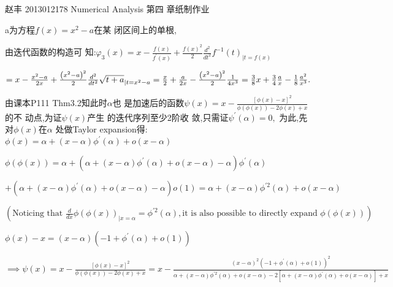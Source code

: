 \documentclass{article}
\begin{document}
\bigskip 赵丰 2013012178 Numerical Analysis 第四%
章纸制作业


\bigskip a为方程$f\left( x\right) =x^{2}-a$在某%
闭区间上的单根,

由迭代函数的构造可%
知:$\varphi _{3}\left( x\right) =x-\frac{f\left( x\right) }{f^{\prime
}\left( x\right) }+\frac{f\left( x\right) ^{2}}{2}\frac{d^{2}}{dt^{2}}%
f^{-1}\left( t\right) _{|t=f\left( x\right) }$

$=x-\frac{x^{2}-a}{2x}+\frac{\left( x^{2}-a\right) ^{2}}{2}\frac{d^{2}}{%
dt^{2}}\sqrt{t+a}_{|t=x^{2}-a}=\frac{x}{2}+\frac{a}{2x}-\frac{\left(
x^{2}-a\right) ^{2}}{2}\frac{1}{4x^{3}}=\allowbreak \allowbreak \frac{3}{8}x+%
\frac{3}{4}\frac{a}{x}-\frac{1}{8}\frac{a^{2}}{x^{3}}.$


由课本P111 Thm3.2知此时$\alpha $也%
是加速后的函数$\psi \left(
x\right) =x-\frac{\left[ \phi \left( x\right) -x\right] ^{2}}{\phi \left(
\phi \left( x\right) \right) -2\phi \left( x\right) +x}$ 的不%
动点,为证$\psi \left( x\right) $产生%
的迭代序列至少2阶收%
敛,只需证$\psi ^{\prime }\left( \alpha \right) =0,$%
为此,先对$\phi \left( x\right) $在$\alpha $%
处做Taylor expansion得: $\phi (x)=\alpha +\left( x-\alpha
\right) \phi ^{\prime }\left( \alpha \right) +o(x-\alpha )$

$\phi \left( \phi \left( x\right) \right) =\alpha +\left( \alpha +\left(
x-\alpha \right) \phi ^{\prime }\left( \alpha \right) +o(x-\alpha )-\alpha
\right) \phi ^{\prime }\left( \alpha \right) $

$+\left( \alpha +\left( x-\alpha \right) \phi ^{\prime }\left( \alpha
\right) +o(x-\alpha )-\alpha \right) o\left( 1\right) =\alpha +\left(
x-\alpha \right) \phi ^{\prime 2}\left( \alpha \right) +o(x-\alpha )$

$\left( \text{Noticing that }\frac{d}{dx}\phi \left( \phi \left( x\right)
\right) _{|x=\alpha }=\phi ^{\prime 2}\left( \alpha \right) ,\text{it is
also possible to directly expand }\phi \left( \phi \left( x\right) \right)
\right) $

$\phi \left( x\right) -x=\left( x-\alpha \right) \left( -1+\phi ^{\prime
}\left( \alpha \right) +o\left( 1\right) \right) $

$\implies \psi \left( x\right) =x-\frac{\left[ \phi \left( x\right) -x\right]
^{2}}{\phi \left( \phi \left( x\right) \right) -2\phi \left( x\right) +x}=x-%
\frac{\left( x-\alpha \right) ^{2}\left( -1+\phi ^{\prime }\left( \alpha
\right) +o\left( 1\right) \right) ^{2}}{\alpha +\left( x-\alpha \right) \phi
^{\prime 2}\left( \alpha \right) +o(x-\alpha )-2\left[ \alpha +\left(
x-\alpha \right) \phi ^{\prime }\left( \alpha \right) +o(x-\alpha )\right] +x%
}$
\end{document}
